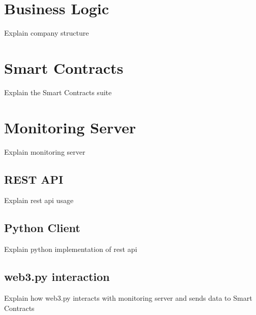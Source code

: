 \section{Business Logic}
Explain company structure

\section{Smart Contracts}
Explain the Smart Contracts suite


\section{Monitoring Server}
Explain monitoring server
\subsection{REST API} 
Explain rest api usage 
\subsection{Python Client}
Explain python implementation of rest api
\subsection{web3.py interaction}
Explain how web3.py interacts with monitoring server and sends data to Smart Contracts
